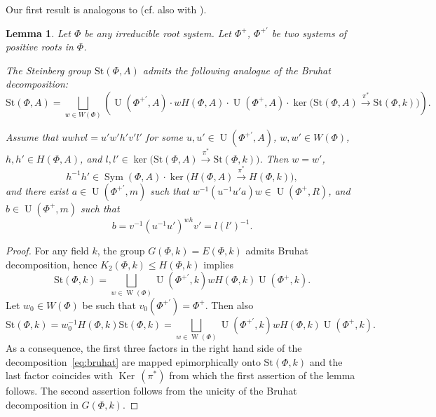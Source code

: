 \documentclass[oneside,12pt]{amsart}
\numberwithin{equation}{section}
\newtheorem{lem}{Lemma}
\numberwithin{lem}{section}
\theoremstyle{definition}
\theoremstyle{remark}
\DeclareMathOperator{\UU}{U}
\DeclareMathOperator{\WW}{W}
\DeclareMathOperator{\Bigker}{Ker\,}
\newcommand{\Stb}{\mathrm{St}}
\DeclareMathOperator{\Stsym}{Sym}
\begin{document}
Our first result is analogous to \cite[Lemma~3.1(e)]{Tu} (cf. also with \cite[\S~2.3A]{HOM}).
\begin{lem}\label{lem:bruhat}
Let $\Phi$ be any irreducible root system.
Let $\Phi^+$, $\Phi^{+'}$ be two systems of positive roots in $\Phi$.
 \begin{lemlist}
\item  The Steinberg group
$\Stb(\Phi,A)$ admits the following analogue of the Bruhat decomposition:
\begin{equation}\label{eq:bruhat}
\Stb(\Phi,A) =\bigsqcup_{w\in W(\Phi)} \left(\UU(\Phi^{+'}, A)\cdot wH(\Phi,A)\cdot\UU(\Phi^+, A) \cdot
\ker\bigl(\Stb(\Phi,A) \xrightarrow{\pi^*} \Stb(\Phi,k)\bigr)\right).
\end{equation}
\item Assume that $uwhvl=u'w'h'v'l'$ for some $u,u'\in \UU(\Phi^{+'}, A)$, $w,w'\in W(\Phi)$,
$h,h'\in H(\Phi,A)$, and $l,l'\in \ker\bigl(\Stb(\Phi,A) \xrightarrow{\pi^*} \Stb(\Phi,k)\bigr)$. Then
$w=w'$,
$$
h^{-1}h'\in \Stsym(\Phi,A)\cdot\ker\bigl(H(\Phi,A) \xrightarrow{\pi^*} H(\Phi,k)\bigr),
$$
and
there exist $a\in \UU(\Phi^{+'},m)$ such that $w^{-1}(u^{-1}u'a)w\in \UU(\Phi^+,R)$,
and $b\in\UU(\Phi^+,m)$ such that
$$
b=v^{-1}(u^{-1}u')^{wh}v'=l(l')^{-1}.
$$
 \end{lemlist}
\end{lem}
\begin{proof}
For any field $k$, the group $G(\Phi,k)=E(\Phi,k)$ admits Bruhat decomposition, hence
$K_2(\Phi,k)\le H(\Phi,k)$ implies
$$
\Stb(\Phi,k)=\bigsqcup_{w\in\WW(\Phi)} \UU(\Phi^{+'}, k) wH(\Phi,k)\UU(\Phi^+, k).
$$
Let $w_0\in W(\Phi)$ be such that $v_0(\Phi^{+'})=\Phi^+$. Then also
$$
\Stb(\Phi,k)=w_0^{-1}H(\Phi,k)\Stb(\Phi,k)=\bigsqcup_{w\in\WW(\Phi)} \UU(\Phi^{+'}, k) wH(\Phi,k)\UU(\Phi^+, k).
$$
As a consequence, the first three factors in the right hand side of the decomposition~\eqref{eq:bruhat} are mapped
epimorphically onto $\Stb(\Phi,k)$ and the last factor coincides with $\Bigker(\pi^*)$
 from which the first assertion of the lemma follows. The second assertion follows from the unicity
of the Bruhat decomposition in $G(\Phi,k)$.
\end{proof}
\end{document}
